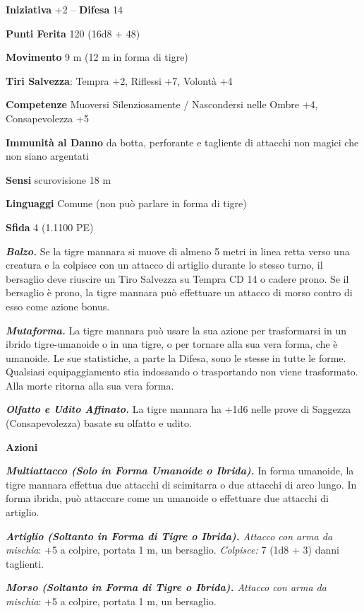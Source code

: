 \begin{multicols}{2}
\textbf{Iniziativa} +2 -- \textbf{Difesa} 14

\textbf{Punti Ferita} 120 (16d8 + 48)

\textbf{Movimento} 9 m (12 m in forma di tigre)

\textbf{Tiri Salvezza}: Tempra +2, Riflessi +7, Volontà +4

\textbf{Competenze} Muoversi Silenziosamente / Nascondersi nelle Ombre +4, Consapevolezza +5

\textbf{Immunità al Danno} da botta, perforante e tagliente di attacchi non magici che non siano argentati

\textbf{Sensi} scurovisione 18 m

\textbf{Linguaggi} Comune (non può parlare in forma di tigre)

\textbf{Sfida} 4 (1.1100 PE)

\emph{\textbf{Balzo.}} Se la tigre mannara si muove di almeno 5 metri in linea retta verso una creatura e la colpisce con un attacco di artiglio durante lo stesso turno, il bersaglio deve riuscire un Tiro Salvezza su Tempra CD 14 o cadere prono. Se il bersaglio è prono, la tigre mannara può effettuare un attacco di morso contro di esso come azione bonus.

\emph{\textbf{Mutaforma.}} La tigre mannara può usare la sua azione per trasformarsi in un ibrido tigre-umanoide o in una tigre, o per tornare alla sua vera forma, che è umanoide. Le sue statistiche, a parte la Difesa, sono le stesse in tutte le forme. Qualsiasi equipaggiamento stia indossando o trasportando non viene trasformato. Alla morte ritorna alla sua vera forma.

\emph{\textbf{Olfatto e Udito Affinato.}} La tigre mannara ha +1d6 nelle prove di Saggezza (Consapevolezza) basate su olfatto e udito.

\textbf{Azioni}

\emph{\textbf{Multiattacco (Solo in Forma Umanoide o Ibrida).}} In forma umanoide, la tigre mannara effettua due attacchi di scimitarra o due attacchi di arco lungo. In forma ibrida, può attaccare come un umanoide o effettuare due attacchi di artiglio.

\emph{\textbf{Artiglio (Soltanto in Forma di Tigre o Ibrida).} Attacco con arma da mischia}: +5 a colpire, portata 1 m, un bersaglio. \emph{Colpisce:} 7 (1d8 + 3) danni taglienti.

\emph{\textbf{Morso (Soltanto in Forma di Tigre o Ibrida).} Attacco con arma da mischia}: +5 a colpire, portata 1 m, un bersaglio.


\end{multicols}
